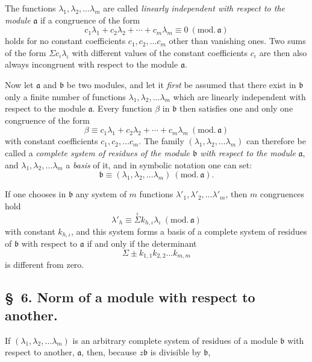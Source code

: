 \documentclass{article}
\begin{document}
The functions $\lambda_{1}, \lambda_{2}, \ldots \lambda_{m}$ are called \emph{linearly independent with respect to the module} $\mathfrak{a}$ if a congruence of the form
\[ c_{1}\lambda_{1} + c_{2}\lambda_{2} + \cdots + c_{m}\lambda_{m} \equiv 0 \ (\text{mod.}\,\mathfrak{a}) \]
holds for no constant coefficients $c_{1}, c_{2}, \ldots c_{m}$ other than vanishing ones. Two sums of the form $\Sigma c_{\iota}\lambda_{\iota}$ with different values of the constant coefficients $c_{\iota}$ are then also always incongruent with respect to the module $\mathfrak{a}$.

Now let $\mathfrak{a}$ and $\mathfrak{b}$ be two modules, and let it \emph{first} be assumed that there exist in $\mathfrak{b}$ only a finite number of functions $\lambda_{1}, \lambda_{2}, \ldots \lambda_{m}$ which are linearly independent with respect to the module $\mathfrak{a}$. Every function $\beta$ in $\mathfrak{b}$ then satisfies one and only one congruence of the form
\[ \beta \equiv c_{1}\lambda_{1} + c_{2}\lambda_{2} + \cdots + c_{m}\lambda_{m} \ (\text{mod.}\,\mathfrak{a}) \]
with constant coefficients $c_{1}, c_{2}, \ldots c_{m}$. The family $(\lambda_{1}, \lambda_{2}, \ldots \lambda_{m})$ can therefore be called a \emph{complete system of residues of the module $\mathfrak{b}$ with respect to the module} $\mathfrak{a}$, and $\lambda_{1}, \lambda_{2}, \ldots \lambda_{m}$ a \emph{basis} of it, and in symbolic notation one can set:
\[ \mathfrak{b} \equiv (\lambda_{1}, \lambda_{2}, \ldots \lambda_{m}) \ (\text{mod.}\,\mathfrak{a}). \]

If one chooses in $\mathfrak{b}$ any system of $m$ functions $\lambda'_{1}, \lambda'_{2}, \ldots \lambda'_{m}$, then $m$ congruences hold
\[ \lambda'_{h} \equiv \overset{\iota}{\Sigma} k_{h,\iota}\lambda_{\iota} \ (\text{mod.}\,\mathfrak{a}) \]
with constant $k_{h,\iota}$, and this system forms a basis of a complete system of residues of $\mathfrak{b}$ with respect to $\mathfrak{a}$ if and only if the determinant
\[ \Sigma \pm k_{1,1}k_{2,2}\ldots k_{m,m} \]
is different from zero.

\subsection*{§~6. Norm of a module with respect to another.}

If $(\lambda_{1}, \lambda_{2}, \ldots \lambda_{m})$ is an arbitrary complete system of residues of a module $\mathfrak{b}$ with respect to another, $\mathfrak{a}$, then, because $z\mathfrak{b}$ is divisible by $\mathfrak{b}$,
\end{document}

